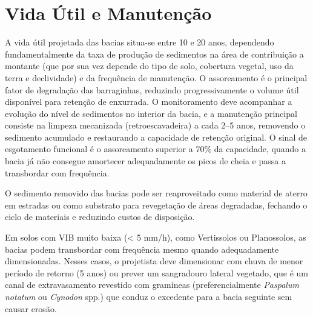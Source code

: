 \documentclass[
  portuguese,
  11pt,
  a4paper,
  open=any]{scrbook}
\begin{document}
\section{Vida Útil e Manutenção}\label{vida-uxfatil-e-manutenuxe7uxe3o}

A vida útil projetada das bacias situa-se entre 10 e 20 anos, dependendo
fundamentalmente da taxa de produção de sedimentos na área de
contribuição a montante (que por sua vez depende do tipo de solo,
cobertura vegetal, uso da terra e declividade) e da frequência de
manutenção. O assoreamento é o principal fator de degradação das
barraginhas, reduzindo progressivamente o volume útil disponível para
retenção de enxurrada. O monitoramento deve acompanhar a evolução do
nível de sedimentos no interior da bacia, e a manutenção principal
consiste na limpeza mecanizada (retroescavadeira) a cada 2--5 anos,
removendo o sedimento acumulado e restaurando a capacidade de retenção
original. O sinal de esgotamento funcional é o assoreamento superior a
70\% da capacidade, quando a bacia já não consegue amortecer
adequadamente os picos de cheia e passa a transbordar com frequência.

O sedimento removido das bacias pode ser reaproveitado como material de
aterro em estradas ou como substrato para revegetação de áreas
degradadas, fechando o ciclo de materiais e reduzindo custos de
disposição.

\begin{tcolorbox}[enhanced jigsaw, leftrule=.75mm, colframe=quarto-callout-warning-color-frame, colback=white, bottomrule=.15mm, opacityback=0, colbacktitle=quarto-callout-warning-color!10!white, breakable, bottomtitle=1mm, opacitybacktitle=0.6, title=\textcolor{quarto-callout-warning-color}{\faExclamationTriangle}\hspace{0.5em}{Atenção}, titlerule=0mm, toprule=.15mm, toptitle=1mm, rightrule=.15mm, left=2mm, arc=.35mm, coltitle=black]

Em solos com VIB muito baixa (\textless{} 5 mm/h), como Vertissolos ou
Planossolos, as bacias podem transbordar com frequência mesmo quando
adequadamente dimensionadas. Nesses casos, o projetista deve dimensionar
com chuva de menor período de retorno (5 anos) ou prever um sangradouro
lateral vegetado, que é um canal de extravasamento revestido com
gramíneas (preferencialmente \emph{Paspalum notatum} ou \emph{Cynodon}
spp.) que conduz o excedente para a bacia seguinte sem causar erosão.

\end{tcolorbox}
\end{document}
